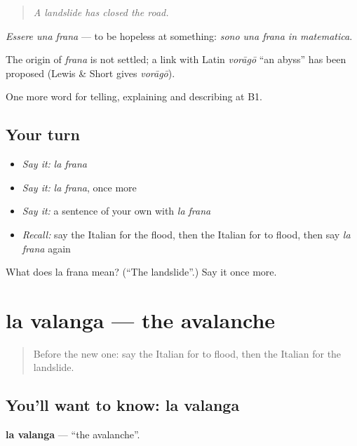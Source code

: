 \begin{quote}
\emph{A landslide has closed the road.}
\end{quote}

\emph{Essere una frana} — to be hopeless at something: \emph{sono una frana in matematica}.

\begin{cousinweb}
The origin of \emph{frana} is not settled; a link with Latin \emph{vorāgō} \textquotedblleft{}an abyss\textquotedblright{} has been proposed (Lewis \& Short gives \emph{vorāgō}).
\end{cousinweb}

\begin{grammarlens}[title={What you've built}]
One more word for telling, explaining and describing at B1.
\end{grammarlens}

\subsection*{Your turn}
\begin{itemize}
\raggedright
  \item \emph{Say it:} \emph{la frana}
  \item \emph{Say it:} \emph{la frana}, once more
  \item \emph{Say it:} a sentence of your own with \emph{la frana}
  \item \emph{Recall:} say the Italian for the flood, then the Italian for to flood, then say \emph{la frana} again
\end{itemize}

\begin{tcolorbox}[breakable,colback=teal!4,colframe=teal!35!black,title={Before you move on}]
What does la frana mean? (\textquotedblleft{}The landslide\textquotedblright{}.) Say it once more.
\end{tcolorbox}
\section[la valanga]{la valanga — the avalanche}

\label{lesson:IT-C305-valanga}



\begin{quote}
Before the new one: say the Italian for to flood, then the Italian for the landslide.
\end{quote}

\subsection*{You'll want to know: la valanga}
\textbf{la valanga} — \textquotedblleft{}the avalanche\textquotedblright{}.

